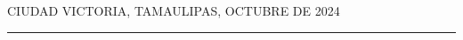 \documentclass[12pt]{article}
\newcommand{\HRule}{\rule{\linewidth}{0.25mm}}
\newcommand{\ncarrera}            {Ingeniería en Tecnologías de la Información}
\newcommand{\NombreAlumno}{
    Mario Coyoy López \\
    Melchor Hernández Díaz \\
    Aldo de Jesús Peña Cuellar \\
    Omar Alejandro Pérez Reyes \\
    Adrian Alejandro Ruíz Márquez \\
    Juan Daniel Torres Colorado
}
\newcommand{\NombreProyecto}{Coche autónomo a escala}
\newcommand{\fechacarta}{26 de Abril de 2021}
\newcommand{\fechaPortada}               {Octubre de 2024}
\newcommand{\separacionCorta}{0.0cm}
\newcommand{\separacionLarga}{0.5cm}
\newcommand{\iemph}[1]{\MakeTextUppercase{#1}}
\begin{document}
\begin{flushright}
\iemph{Ciudad Victoria, Tamaulipas, \fechaPortada}
\end{flushright}

\HRule 

\end{document}
